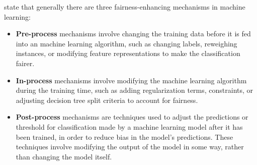 \documentclass[
	12pt,
    a4paper,
    egregdoesnotlikesansseriftitles, %
    toc=chapterentrywithdots,
    oneside, openany,
    titlepage,
    parskip=half,
    headings=normal,  %
    listof=totoc,
    bibliography=totocnumbered,
    index=totoc,
    captions=tableheading,  %
    listof=flat,
    numbers=noenddot, %
    final]
    {scrbook}
\begin{document}
\textcite[p. 8-.10]{fairness} state that generally there are three fairness-enhancing mechanisms in machine learning: 
\begin{itemize}
 \item \textbf{Pre-process} mechanisms involve changing the training data before it is fed into an machine learning algorithm, such as changing labels, reweighing instances, or modifying feature representations to make the classification fairer.
 \item \textbf{In-process} mechanisms involve modifying the machine learning algorithm during the training time, such as adding regularization terms, constraints, or adjusting decision tree split criteria to account for fairness.
 \item \textbf{Post-process} mechanisms are techniques used to adjust the predictions or threshold for classification made by a machine learning model after it has been trained, in order to reduce bias in the model's predictions. These techniques involve modifying the output of the model in some way, rather than changing the model itself.
\end{itemize}

%


%
\end{document}
